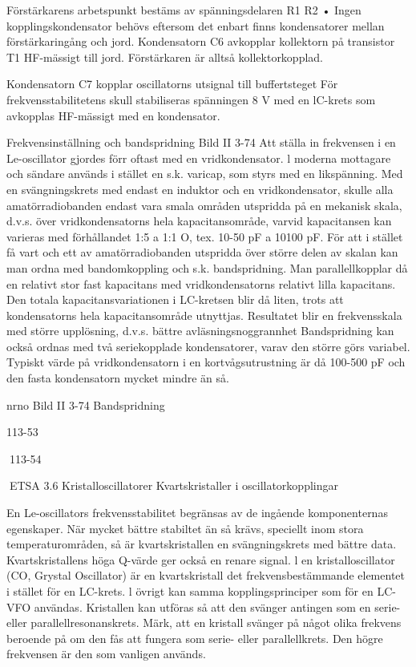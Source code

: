 {{{{Förstärkarens arbetspunkt bestäms av
spänningsdelaren R1 R2 • Ingen kopplingskondensator behövs eftersom det enbart
finns kondensatorer mellan förstärkaringång
och jord.
Kondensatorn C6 avkopplar kollektorn på
transistor T1 HF-mässigt till jord. Förstärkaren är alltså kollektorkopplad.

Kondensatorn C7 kopplar oscillatorns utsignal till buffertsteget För frekvensstabilitetens skull stabiliseras spänningen 8 V med
en lC-krets som avkopplas HF-mässigt med
en kondensator.

Frekvensinställning och bandspridning
Bild II 3-74
Att ställa in frekvensen i en Le-oscillator
gjordes förr oftast med en vridkondensator.
l moderna mottagare och sändare används
i stället en s.k. varicap, som styrs med en
likspänning.
Med en svängningskrets med endast en
induktor och en vridkondensator, skulle alla
amatörradiobanden endast vara smala områden utspridda på en mekanisk skala, d.v.s.
över vridkondensatorns hela kapacitansområde, varvid kapacitansen kan varieras med
förhållandet 1:5 a 1:1 O, tex. 10-50 pF a 10100 pF.
För att i stället få vart och ett av amatörradiobanden utspridda över större delen av
skalan kan man ordna med bandomkoppling
och s.k. bandspridning. Man parallellkopplar
då en relativt stor fast kapacitans med vridkondensatorns relativt lilla kapacitans. Den
totala kapacitansvariationen i LC-kretsen blir
då liten, trots att kondensatorns hela kapacitansområde utnyttjas. Resultatet blir en frekvensskala med större upplösning, d.v.s. bättre avläsningsnoggrannhet
Bandspridning kan också ordnas med
två seriekopplade kondensatorer, varav den
större görs variabel. Typiskt värde på vridkondensatorn i en kortvågsutrustning är då
100-500 pF och den fasta kondensatorn
mycket mindre än så.

nrno
Bild II 3-74 Bandspridning

113-53

113-54

ETSA
3.6 Kristalloscillatorer
Kvartskristaller i oscillatorkopplingar

En Le-oscillators frekvensstabilitet begränsas av de ingående komponenternas egenskaper. När mycket bättre stabiltet än så
krävs, speciellt inom stora temperaturområden, så är kvartskristallen en svängningskrets med bättre data. Kvartskristallens höga
Q-värde ger också en renare signal.
l en kristalloscillator (CO, Grystal Oscillator) är en kvartskristall det frekvensbestämmande elementet i stället för en LC-krets. l
övrigt kan samma kopplingsprinciper som
för en LC-VFO användas.
Kristallen kan utföras så att den svänger
antingen som en serie- eller parallellresonanskrets. Märk, att en kristall svänger på
något olika frekvens beroende på om den fås
att fungera som serie- eller parallellkrets.
Den högre frekvensen är den som vanligen
används.

}}}}
